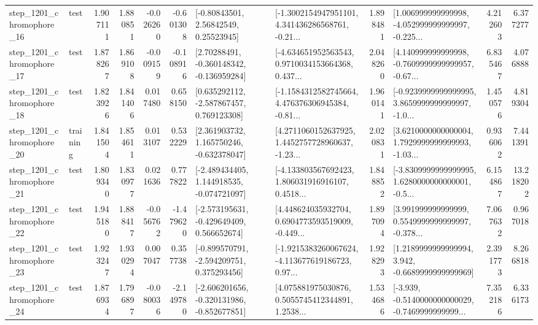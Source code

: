 \begin{tabular}{llrrrrllrlrr}
 step\_1201\_chromophore\_16 &      test &      1.907111 &    1.880851 &     -0.026260 & -0.601308 &       [-0.80843501, 2.56842549, 0.25523945] &  [-1.3002154947951101, 4.341436286568761, -0.21... &       1.898481 &  [1.006999999999998, -4.052999999999997, -0.225... &            4.212603 &          6.377277 \\
 step\_1201\_chromophore\_17 &      test &      1.878267 &    1.869108 &     -0.009159 & -0.108916 &    [2.70288491, -0.360148342, -0.136959284] &  [-4.634651952563543, 0.9710034153664368, 0.437... &       2.048260 &  [4.140999999999998, -0.7609999999999957, -0.67... &            6.835467 &          4.076888 \\
 step\_1201\_chromophore\_18 &      test &      1.823926 &    1.841406 &      0.017480 &  0.658150 &    [0.635292112, -2.587867457, 0.769123308] &  [-1.1584312582745664, 4.476376306945384, -0.81... &       1.960141 &  [-0.9239999999999995, 3.8659999999999997, -1.0... &            1.450576 &          4.819304 \\
 step\_1201\_chromophore\_20 &  training &      1.841504 &    1.854611 &      0.013107 &  0.532229 &    [2.361903732, 1.165750246, -0.632378047] &  [4.2711060152637925, 1.4452757728960637, -1.23... &       2.020831 &  [3.6210000000000004, 1.7929999999999993, -1.03... &            0.936062 &          7.441391 \\
 step\_1201\_chromophore\_21 &      test &      1.809340 &    1.830977 &      0.021636 &  0.777822 &   [-2.489434405, 1.144918535, -0.074721097] &  [-4.133803567692423, 1.806031916916107, 0.4518... &       1.848852 &  [-3.8309999999999995, 1.6280000000000001, -0.5... &            6.154867 &         13.218202 \\
 step\_1201\_chromophore\_22 &      test &      1.945180 &    1.888417 &     -0.056762 & -1.479620 &   [-2.573195631, -0.429649409, 0.566652674] &  [4.448624035932704, 0.6904773593519009, -0.449... &       1.897094 &  [3.991999999999999, 0.5549999999999997, -0.378... &            7.067632 &          0.967018 \\
 step\_1201\_chromophore\_23 &      test &      1.923247 &    1.930294 &      0.007047 &  0.357738 &   [-0.899570791, -2.594209751, 0.375293456] &  [-1.9215383260067624, -4.113677619186723, 0.97... &       1.928293 &   [1.2189999999999994, 3.942, -0.6689999999999969] &            2.391773 &          8.266818 \\
 step\_1201\_chromophore\_24 &      test &      1.876934 &    1.796897 &     -0.080036 & -2.149780 &  [-2.606201656, -0.320131986, -0.852677851] &  [4.075881975030876, 0.5055745412344891, 1.2538... &       1.534686 &  [-3.939, -0.5140000000000029, -0.7469999999999... &            7.352186 &          6.336173 \\

\end{tabular}
